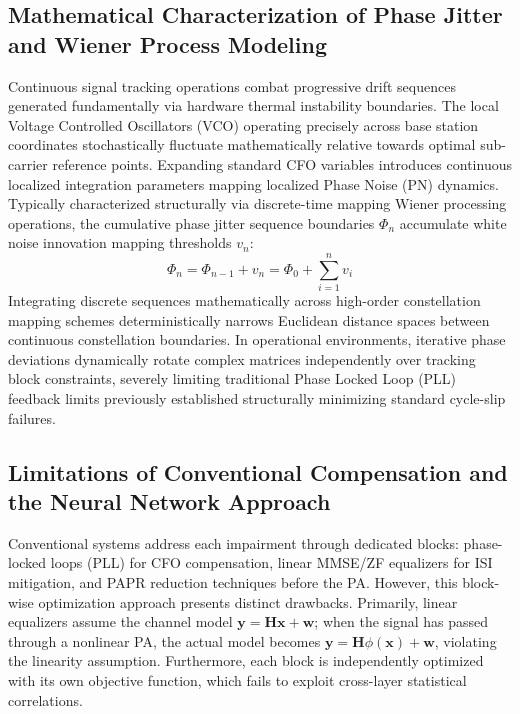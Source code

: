 \documentclass[a4paper,14pt]{extreport}
\begin{document}
\subsection{Mathematical Characterization of Phase Jitter and Wiener Process Modeling}
Continuous signal tracking operations combat progressive drift sequences generated fundamentally via hardware thermal instability boundaries. The local Voltage Controlled Oscillators (VCO) operating precisely across base station coordinates stochastically fluctuate mathematically relative towards optimal sub-carrier reference points. Expanding standard CFO variables introduces continuous localized integration parameters mapping localized Phase Noise (PN) dynamics. Typically characterized structurally via discrete-time mapping Wiener processing operations, the cumulative phase jitter sequence boundaries $\Phi_n$ accumulate white noise innovation mapping thresholds $v_n$:
\begin{equation}
    \Phi_n = \Phi_{n-1} + v_n = \Phi_0 + \sum_{i=1}^{n} v_i
\end{equation}
Integrating discrete sequences mathematically across high-order constellation mapping schemes deterministically narrows Euclidean distance spaces between continuous constellation boundaries. In operational environments, iterative phase deviations dynamically rotate complex matrices independently over tracking block constraints, severely limiting traditional Phase Locked Loop (PLL) feedback limits previously established structurally minimizing standard cycle-slip failures.

\subsection{Limitations of Conventional Compensation and the Neural Network Approach}

Conventional systems address each impairment through dedicated blocks: phase-locked loops (PLL) for CFO compensation, linear MMSE/ZF equalizers for ISI mitigation, and PAPR reduction techniques before the PA. However, this block-wise optimization approach presents distinct drawbacks. Primarily, linear equalizers assume the channel model $\mathbf{y} = \mathbf{H}\mathbf{x} + \mathbf{w}$; when the signal has passed through a nonlinear PA, the actual model becomes $\mathbf{y} = \mathbf{H}\phi(\mathbf{x}) + \mathbf{w}$, violating the linearity assumption. Furthermore, each block is independently optimized with its own objective function, which fails to exploit cross-layer statistical correlations.
\end{document}
